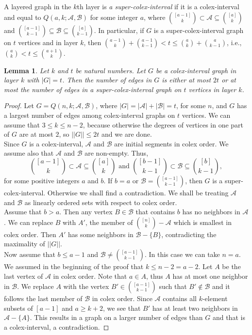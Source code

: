 \documentclass[11pt, a4paper]{article}
\newtheorem{lemma}[theorem]{Lemma}
\newcommand{\cA}{\mathcal{A}}
\newcommand{\cB}{\mathcal{B}}
\begin{document}
A layered graph in the $k$th layer is  {\it a super-colex-interval} if it is  a colex-interval and equal to $Q(a,k;\cA,\cB)$ for some integer $a$, where  $\binom{[a-1]}{k} \subset \cA  \subseteq   \binom{[a]}{k}$ and 
$\binom{[a-1]}{k-1} \subseteq \cB \subseteq  \binom{[a]}{k-1}$.  In particular,  if $G$ is a super-colex-interval graph on $t$ vertices and  in layer $k$, then $\binom{a-1}{k} + \binom{a-1}{k-1}< t \leq \binom{a}{k} + \binom{a}{k-1}$, i.e., $\binom{a}{k} < t \leq \binom{a+1}{k}$. \\



\begin{lemma}\label{supercompressed}
Let $k$ and $t$ be natural numbers. Let  $G$ be a colex-interval graph in layer $k$ with $|G|=t$. Then the number of edges in $G$ is either at most $2t$ or  at most the number of edges in a super-colex-interval graph on $t$ vertices in layer $k$.  
 \end{lemma}


\begin{proof}
Let $G=Q(n, k; \cA, \cB)$, where  $|G|= |\cA|+|\cB|=t$, for  some $n$, and $G$ has a largest number of edges among colex-interval graphs on $t$ vertices.  We can assume that $3\leq k \leq n-2$, because otherwise the degrees of vertices in one part of $G$ are at most $2$, so $||G|| \leq 2t$ and we are done.\\


Since $G$ is a colex-interval,  $\cA$  and $\cB$ are initial segments in colex order.  We assume also that $\cA$ and $\cB$ are non-empty.
 Thus,
  $$\binom{[a-1]}{k} \subset \cA \subseteq \binom{[a]}{k} \mbox{ and }  \binom{[b-1]}{k-1} \subset \cB \subseteq  \binom{[b]}{k-1},$$ for some positive integers $a$ and $b$.
If $b=a$ or $\cB=\binom{[a-1]}{k-1}$, then $G$ is a super-colex-interval.  Otherwise we shall find a contradiction.  We shall be treating $\cA$ and $\cB$ as linearly ordered sets with respect to colex order. \\

Assume that  $b>a$. Then any vertex $B\in\cB$ that contains $b$ has no neighbors in $\cA$. We can  replace $B$ with $A'$, the member of $\binom{[n]}{k}-\mathcal{A}$ which is smallest in colex order. Then $A'$ has some neighbors in $\cB-\{B\}$, contradicting the maximality of $||G||$.\\

Now assume that $b\le a-1$ and $\cB\neq \binom{[a-1]}{k-1}$.
In this case we can take $n=a$. We assumed in the beginning of the proof that $k\leq n-2 = a-2$.
Let $A$ be the last vertex of $\cA$ in colex order. Note that $a\in A$, thus $A$ has at most one neighbor in $\cB$.
We replace $A$ with the vertex 
$B' \in \binom{[a-1]}{k-1}$ such that $B'\not\in \cB$ and it follows the last member of $\cB$ in colex order.
Since $\cA$ contains all $k$-element subsets of $[a-1]$ and $a\geq k+2$, we see that $B'$ has at least two neighbors in $\cA-\{A\}$.
This results in a graph on a larger number of edges than $G$ and that is a colex-interval, a contradiction.
\end{proof}
\end{document}

